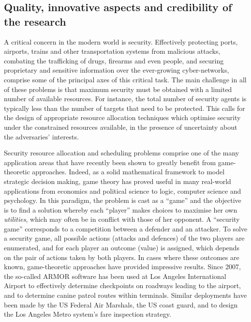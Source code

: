 
\subsection{Quality, innovative aspects and credibility of the research} %
\label{sec:quality}

A critical concern in the modern world is security. Effectively protecting ports, airports, trains and other transportation systems from malicious attacks, combating the trafficking of drugs, firearms and even people, and securing proprietary and sensitive information over the ever-growing cyber-networks, comprise some of the principal axes of this critical task. The main challenge in all of these problems is that maximum security must be obtained with a limited number of available resources. For instance, the total number of security agents is typically less than the number of targets that need to be protected. %
This calls for the design of appropriate resource allocation techniques which optimise security under the constrained resources available, in the presence of uncertainty about the adversaries' interests. %
 
Security resource allocation and scheduling problems comprise one of the many application areas that have recently been shown to greatly benefit from game-theoretic approaches. Indeed, as a solid mathematical framework to model strategic decision making, game theory has proved useful in many real-world applications from economics and political science to logic, computer science and psychology. In this paradigm, the problem is cast as a ``game'' and the objective is to find a solution whereby each ``player'' makes choices to maximise her own \textit{utilities}, which may often be in conflict with those of her opponent. A ``security game'' corresponds to a competition between a defender and an attacker. To solve a security game, all possible actions (attacks and defences) of the two players are enumerated, and for each player an outcome (value) is assigned, which depends on the pair of actions taken by both players. In cases where these outcomes are known, game-theoretic approaches have provided impressive results. Since 2007, the so-called ARMOR software \cite{pita2008deployed} has been used at Los Angeles International Airport to effectively determine checkpoints on roadways leading to the airport, and to determine canine patrol routes within terminals. Similar deployments have been made by the US Federal Air Marshals, the US coast guard, and to design the Los Angeles Metro system's fare inspection strategy\cite{tsai2009iris,shieh2012protect,yin2012trusts}. 

